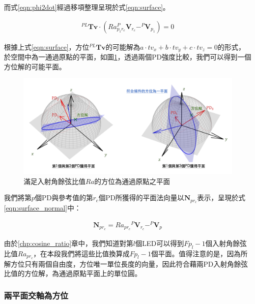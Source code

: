         \noindent 
        而式\ref{eqn:phi2dot}經過移項整理呈現於式\ref{eqn:surface}。

            \begin{gather}
                 \label{eqn:surface}
                 ^{PL}\boldsymbol{Tv} \cdot(Ra_{p_1r_c} ^P\boldsymbol{V}_{r_c}-
                 ^P\boldsymbol{V}_{p_1})=0
            \end{gather}

        根據上式\ref{eqn:surface}，方位$^{PL}\boldsymbol{Tv}$的可能解為$a\cdot tv_x+b\cdot tv_y+c\cdot tv_z=0$的形式，於空間中為一通過原點的平面，如圖\ref{pic:solve_surface}，透過兩個PD強度比較，我們可以得到一個方位解的可能平面。
       

       \begin{figure}[htpb]
        \centering
        \includegraphics[width=14cm]{ch3pic/solve_surface.png}
        \caption{滿足入射角餘弦比值$Ra$的方位為通過原點之平面}
        \label{pic:solve_surface}
        \end{figure}

         
        我們將第$p$個PD與參考值的第$r_c$個PD所獲得的平面法向量以$\boldsymbol{N}_{pr_c}$表示，呈現於式\ref{eqn:surface_normal}中：
        
        \begin{gather}
            \label{eqn:surface_normal}
            \boldsymbol{N}_{pr_c}  = {Ra_{pr_c}}{} ^P\boldsymbol{V}_{r_c}-
            ^P\boldsymbol{V}_{p}
       \end{gather}
        
        \noindent 由於\ref{chp:cosine_ratio}章中，我們知道對第$l$個LED可以得到$Fp_l-1$個入射角餘弦比值$Ra_{pr_c}$，在本段我們將這些比值換算成$Fp_l-1$個平面。值得注意的是，因為所解方位只有兩個自由度，方位唯一單位長度的向量，因此符合藉兩PD入射角餘弦比值的方位解，為通過原點平面上的單位圓。


    \subsubsection{兩平面交軸為方位}
    \label{chp:solve_axis}

